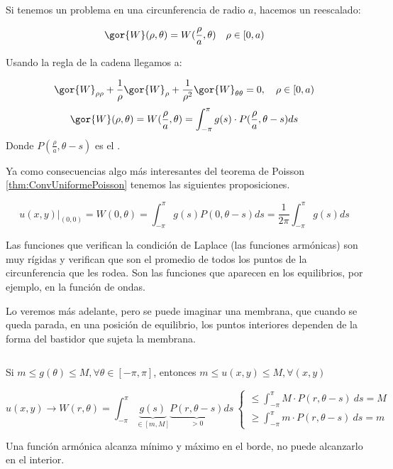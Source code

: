 
		Si tenemos un problema en una circunferencia de radio $a$, hacemos un reescalado:

		\[ \gor{W}(\rho, \theta) = W(\frac{\rho}{a},\theta) \quad \rho \in [0,a) \]

		Usando la regla de la cadena llegamos a:

		\[\gor{W}_{\rho \rho} + \frac{1}{\rho} \gor{W}_\rho + \frac{1}{\rho^2} \gor{W}_{\theta \theta} = 0, \quad \rho \in [0,a)  \]
		\[\gor{W}(\rho, \theta) = W(\frac{\rho}{a},\theta) = \int^{\pi}_{-\pi} g(s) \cdot {P(\frac{\rho}{a},\theta-s)} ds \]
		Donde $P(\frac{\rho}{a},\theta-s)$ es el .

		Ya como consecuencias algo más interesantes del teorema de Poisson \ref{thm:ConvUniformePoisson} tenemos las siguientes proposiciones.

		\begin{prop}

		 \[u(x,y)|_{(0,0)}  = W(0,\theta) = \int_{-\pi}^\pi g(s) P(0, \theta - s) ds = \frac{1}{2\pi} \int_{-\pi}^\pi g(s) ds \]
		\end{prop}

		Las funciones que verifican la condición de Laplace (las funciones armónicas) son muy rígidas y verifican que son el promedio de todos los puntos de la circunferencia que les rodea. Son las funciones que aparecen en los equilibrios, por ejemplo, en la función de ondas.

		Lo veremos más adelante, pero se puede imaginar una membrana, que cuando se queda parada, en una posición de equilibrio, los puntos interiores dependen de la forma del bastidor que sujeta la membrana.

		\begin{prop}
		$ $ %

		Si $m \leq g(\theta) \leq M, \forall \theta \in [-\pi,\pi]$, entonces $m \leq u(x,y) \leq M, \forall (x,y)$

		\[u(x,y) \rightarrow W(r,\theta) = \int_{-\pi}^{\pi} \underbrace{g(s)}_{\in [m,M]} \underbrace{P(r,\theta-s)}_{> 0} ds \ \begin{cases}
			\leq {\displaystyle \int_{-\pi}^{\pi}} M \cdot P(r,\theta-s)\  ds = M \\
			\geq {\displaystyle \int_{-\pi}^{\pi}} m \cdot P(r,\theta-s)\  ds = m

		\end{cases} \]

		\noindent Una función armónica alcanza mínimo y máximo en el borde, no puede alcanzarlo en el interior.
		\end{prop}

